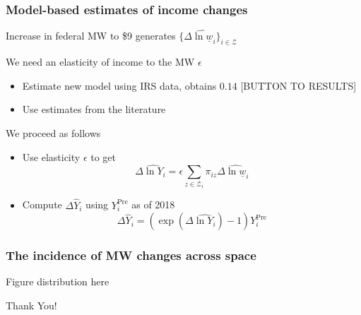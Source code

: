 \documentclass[aspectratio=169, t]{beamer}
\newcommand{\Z}{\mathcal{Z}}
\newcommand{\MW}{\underline{w}}
\begin{document}
\begin{frame}
	\frametitle{Model-based estimates of income changes}
	
	Increase in federal MW to \$9 generates $\{\Delta \hat{\ln \MW}_i\}_{i\in\Z}$
	
	\pause
	\vspace{3mm}
	We need an elasticity of income to the MW $\epsilon$
	\begin{itemize}
		\item Estimate new model using IRS data, obtains $0.14$ [BUTTON TO RESULTS]
		\vspace{1mm} 
		\item Use estimates from the literature \parencite{CegnizEtAl2019}
	\end{itemize}

	\pause
	\vspace{3mm}
	We proceed as follows
	\begin{itemize}
		\item Use elasticity $\epsilon$ to get
		\begin{equation*}
			\Delta \hat{\ln Y}_i = \epsilon \sum_{z\in\Z_i} \pi_{iz} \Delta \hat{\ln \MW}_i
		\end{equation*}
		\vspace{1mm} 
		\item Compute $\Delta \hat Y_i$ using $Y_i^{\text{Pre}}$ as of 2018
		$$\Delta \hat Y_i = \left(\exp(\Delta \hat{\ln Y_i}) - 1 \right) Y_i^{\text{Pre}}$$
	\end{itemize}
\end{frame}

\begin{frame}
	\frametitle{The incidence of MW changes across space}
	
	Figure distribution here
\end{frame}

\begin{frame}[c]
    \begin{center}
    	\Large Thank You!
    \end{center}
\end{frame}


\appendix

\renewcommand\thetable{\thesection.\arabic{table}} 
\renewcommand\thefigure{\thesection.\arabic{figure}} 
\setcounter{table}{0}
\setcounter{figure}{0}
\end{document}
